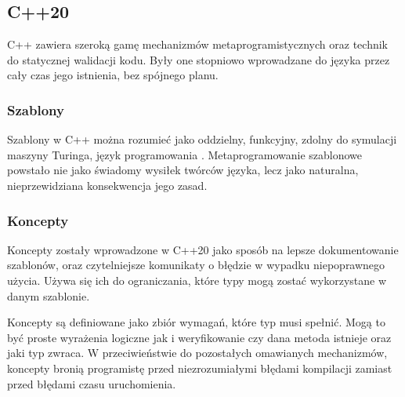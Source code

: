 \subsection{C++20}
C++ zawiera szeroką gamę mechanizmów metaprogramistycznych oraz technik do statycznej walidacji kodu. Były one stopniowo wprowadzane do języka przez cały czas jego istnienia, bez spójnego planu.\par
\subsubsection{Szablony}
Szablony w C++ można rozumieć jako oddzielny, funkcyjny, zdolny do symulacji maszyny Turinga, język programowania \cite{template_turing_complete}.
Metaprogramowanie szablonowe powstało nie jako świadomy wysiłek twórców języka, lecz jako naturalna, nieprzewidziana konsekwencja jego zasad.

\subsubsection{Koncepty}
Koncepty zostały wprowadzone w C++20 jako sposób na lepsze dokumentowanie szablonów, oraz czytelniejsze komunikaty o błędzie w wypadku niepoprawnego użycia.
Używa się ich do ograniczania, które typy mogą zostać wykorzystane w danym szablonie.

Koncepty są definiowane jako zbiór wymagań, które typ musi spełnić.
Mogą to być proste wyrażenia logiczne jak i weryfikowanie czy dana metoda istnieje oraz jaki typ zwraca.
W przeciwieństwie do pozostałych omawianych mechanizmów, koncepty bronią programistę przed niezrozumiałymi błędami kompilacji zamiast przed błędami czasu uruchomienia.

